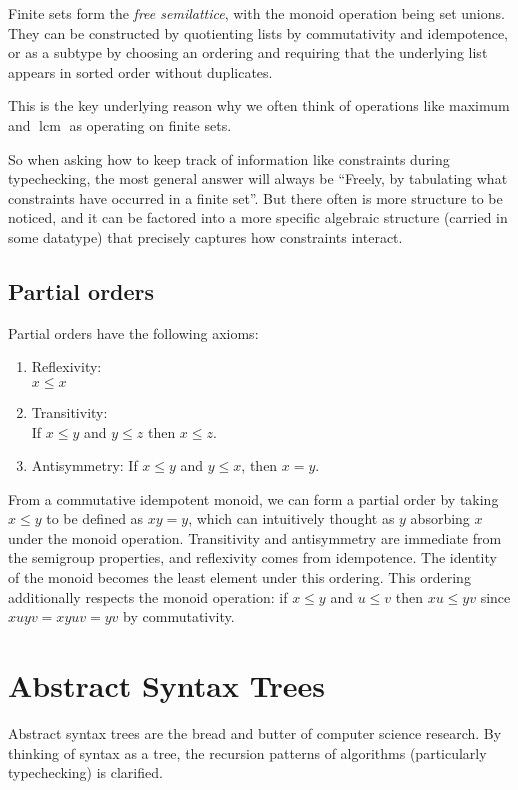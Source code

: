 \documentclass[11pt, twoside, reqno]{book}
\begin{document}
Finite sets form the \emph{free semilattice}, with the monoid operation being set unions.
They can be constructed by quotienting lists by commutativity and idempotence, or as a subtype by choosing an ordering and requiring that the underlying list appears in sorted order without duplicates.

This is the key underlying reason why we often think of operations like maximum and \(\mathop{lcm}\) as operating on finite sets.

So when asking how to keep track of information like constraints during typechecking, the most general answer will always be ``Freely, by tabulating what constraints have occurred in a finite set''.
But there often is more structure to be noticed, and it can be factored into a more specific algebraic structure (carried in some datatype) that precisely captures how constraints interact.

\subsection{Partial orders}

Partial orders have the following axioms:
\begin{enumerate}
\item Reflexivity:\\
  \(x \le x\)
\item Transitivity:\\
  If \(x \le y\) and \(y \le z\) then \(x \le z\).
\item Antisymmetry:
  If \(x \le y\) and \(y \le x\), then \(x = y\).
\end{enumerate}

From a commutative idempotent monoid, we can form a partial order by taking \(x \le y\) to be defined as \(xy = y\), which can intuitively thought as \(y\) absorbing \(x\) under the monoid operation.
Transitivity and antisymmetry are immediate from the semigroup properties, and reflexivity comes from idempotence.
The identity of the monoid becomes the least element under this ordering.
This ordering additionally respects the monoid operation: if \(x \le y\) and \(u \le v\) then \(xu \le yv\) since \(xuyv = xyuv = yv\) by commutativity.

\section{Abstract Syntax Trees}

Abstract syntax trees are the bread and butter of computer science research.
By thinking of syntax as a tree, the recursion patterns of algorithms (particularly typechecking) is clarified.
\end{document}
